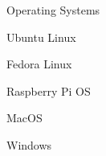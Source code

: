 \begin{skillset}{Operating Systems}
  \item Ubuntu Linux
  \item Fedora Linux
  \item Raspberry Pi OS
  \item MacOS
  \item Windows
\end{skillset}
